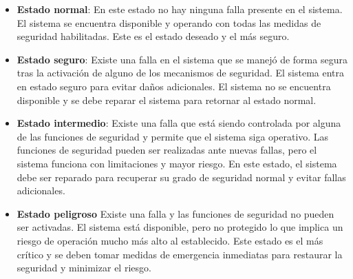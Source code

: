 \begin{itemize}
    \item \textbf{Estado normal}: En este estado no hay ninguna falla presente en el sistema. El sistema se encuentra disponible y operando con todas las medidas de seguridad habilitadas. Este es el estado deseado y el más seguro. 
    \item \textbf{Estado seguro}: Existe una falla en el sistema que se manejó de forma segura tras la activación de alguno de los mecanismos de seguridad. El sistema entra en estado seguro para evitar daños adicionales. El sistema no se encuentra disponible y se debe reparar el sistema para retornar al estado normal. 
    \item \textbf{Estado intermedio}: Existe una falla que está siendo controlada por alguna de las funciones de seguridad y permite que el sistema siga operativo. Las funciones de seguridad pueden ser realizadas ante nuevas fallas, pero el sistema funciona con limitaciones y mayor riesgo. En este estado, el sistema debe ser reparado para recuperar su grado de seguridad normal y evitar fallas adicionales. 
    \item \textbf{Estado peligroso} Existe una falla y las funciones de seguridad no pueden ser activadas. El sistema está disponible, pero no protegido lo que implica un riesgo de operación mucho más alto al establecido. Este estado es el más crítico y se deben tomar medidas de emergencia inmediatas para restaurar la seguridad y minimizar el riesgo. \\ 
    
\end{itemize}




